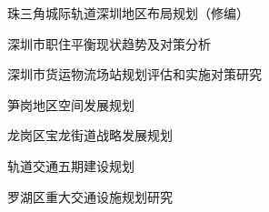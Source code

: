 \begin{cit}
\item 珠三角城际轨道深圳地区布局规划（修编）
\item 深圳市职住平衡现状趋势及对策分析
\item 深圳市货运物流场站规划评估和实施对策研究
\item 笋岗地区空间发展规划
\item 龙岗区宝龙街道战略发展规划
\item 轨道交通五期建设规划
\item 罗湖区重大交通设施规划研究
\end{cit}

















